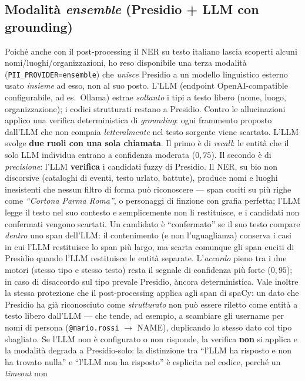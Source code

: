 \documentclass[11pt,a4paper]{article}
\begin{document}
\subsection{Modalità \emph{ensemble} (Presidio + LLM con grounding)}\label{sec:ensemble} Poiché anche con il
post-processing il NER su testo italiano lascia scoperti alcuni nomi/luoghi/organizzazioni,
ho reso disponibile una terza modalità (\texttt{PII\_PROVIDER=ensemble}) che \emph{unisce}
Presidio a un modello linguistico esterno usato \emph{insieme} ad esso, non al suo posto.
L'LLM (endpoint OpenAI-compatible configurabile, ad es.\ Ollama) estrae \emph{soltanto} i
tipi a testo libero (nome, luogo, organizzazione); i codici strutturati restano a Presidio.
Contro le allucinazioni applico una verifica deterministica di \emph{grounding}: ogni
frammento proposto dall'LLM che non compaia \emph{letteralmente} nel testo sorgente viene
scartato. L'LLM svolge \textbf{due ruoli con una sola chiamata}. Il primo è di
\emph{recall}: le entità che il solo LLM individua entrano a confidenza moderata
($0{,}75$). Il secondo è di \emph{precisione}: l'LLM \textbf{verifica} i candidati fuzzy di
Presidio. Il NER, su bio non discorsive (cataloghi di eventi, testo urlato, battute),
produce nomi e luoghi inesistenti che nessun filtro di forma può riconoscere --- span
cuciti su più righe come \emph{``Cortona Parma Roma''}, o personaggi di finzione con
grafia perfetta; l'LLM legge il testo nel suo contesto e semplicemente non li restituisce,
e i candidati non confermati vengono scartati. Un candidato è ``confermato'' se il suo
testo compare \emph{dentro} uno span dell'LLM: il contenimento (e non l'uguaglianza)
conserva i casi in cui l'LLM restituisce lo span più largo, ma scarta comunque gli span
cuciti di Presidio quando l'LLM restituisce le entità separate. L'\emph{accordo} pieno tra
i due motori (stesso tipo e stesso testo) resta il segnale di confidenza più forte
($0{,}95$); in caso di disaccordo sul tipo prevale Presidio, àncora deterministica. Vale
inoltre la stessa protezione che il post-processing applica agli span di spaCy: un dato che
Presidio ha già riconosciuto come \emph{strutturato} non può essere riletto come entità a
testo libero dall'LLM --- che tende, ad esempio, a scambiare gli username per nomi di
persona (\texttt{@mario.rossi} $\to$ NAME), duplicando lo stesso dato col tipo sbagliato.
Se l'LLM non è configurato o non risponde, la verifica \textbf{non} si applica e la
modalità degrada a Presidio-solo: la distinzione tra ``l'LLM ha risposto e non ha trovato
nulla'' e ``l'LLM non ha risposto'' è esplicita nel codice, perché un \emph{timeout} non
\end{document}
